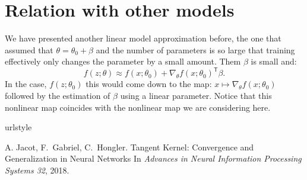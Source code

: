\documentclass[a4paper,10pt]{article}
\newcommand{\trnsp}{\mathsf{T}}
\begin{document}
\section{Relation with other models}
We have presented another linear model approximation before, the one that assumed that $\theta  = \theta_0 + \beta$ and the number of parameters is so large that training effectively only changes the parameter by a small amount. Them $\beta$ is small and:
\begin{equation*}
f(z; \theta) \approx  f(x; \theta_0) + \nabla_\theta f(x; \theta_0)^\trnsp\beta.
\end{equation*}
In the case,  $f(z; \theta_0)$ this would come down to the map: $x \mapsto  \nabla_\theta  f(x; \theta_0)$ followed by the estimation of $\beta$ using a linear parameter. Notice that this nonlinear map coincides with the nonlinear map we are considering here.





\begin{thebibliography}{2}
\providecommand{\natexlab}[1]{#1}
\providecommand{\url}[1]{\texttt{#1}}
\expandafter\ifx\csname urlstyle\endcsname\relax
  \providecommand{\doi}[1]{doi: #1}\else
  \providecommand{\doi}{doi: \begingroup \urlstyle{rm}\Url}\fi


A. Jacot, F.~Gabriel, C.~Hongler.
 {{Tangent}} {{Kernel}}: {{Convergence}} and {{Generalization}} in {{Neural}} {{Networks}}
\newblock In \emph{Advances in {{Neural Information Processing Systems}} 32},
  2018.

  
\end{thebibliography}
\end{document}
